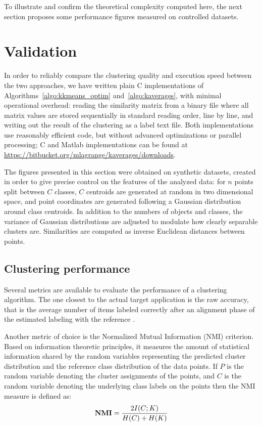 \documentclass[10pt,journal,compsoc]{IEEEtran}
\begin{document}
To illustrate and confirm the theoretical complexity computed here, the next section proposes some performance figures measured on controlled datasets.

\section{Validation}
\label{sec:validation}

In order to reliably compare the clustering quality and execution speed between the two approaches, we have written plain C implementations of Algorithms~\ref{algo:kkmeans_optim} and~\ref{algo:kaverages}, with minimal operational overhead: reading the similarity matrix from a binary file where all matrix values are stored sequentially in standard reading order, line by line, and writing out the result of the clustering as a label text file. Both implementations use reasonably efficient code, but without advanced optimizations or parallel processing; C and Matlab implementations can be found at\\ \url{https://bitbucket.org/mlagrange/kaverages/downloads}.	%

The figures presented in this section were obtained on synthetic datasets, created in order to give precise control on the features of the analyzed data: for $n$ points split between $C$ classes, $C$ centroids are generated at random in two dimensional space, and point coordinates are generated following a Gaussian distribution around class centroids. In addition to the numbers of objects and classes, the variance of Gaussian distributions are adjusted to modulate how clearly separable clusters are. Similarities are computed as inverse Euclidean distances between points. %

\subsection{Clustering performance}

Several metrics are available to evaluate the performance of a clustering algorithm. The one closest to the actual target application is the raw accuracy, that is the average number of items labeled correctly after an alignment phase of the estimated labeling with the reference \cite{Kuhn1955Hungarian}.

Another metric of choice is the Normalized Mutual Information (NMI) criterion. Based on information theoretic principles, it measures the amount of statistical information shared by the random variables representing the predicted cluster distribution and the reference class distribution of the data points. If $P$ is the random variable denoting the cluster assignments of the points, and $C$ is the random variable denoting the underlying class labels on the points then the NMI measure is defined as:
\begin{equation}
\textbf{NMI} = \frac{ 2\- I(C;K) }{H(C)+H(K)}
\end{equation}
\end{document}
